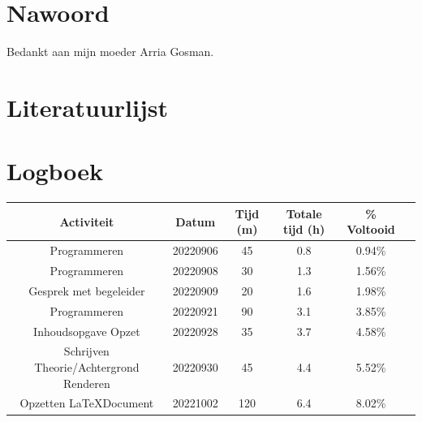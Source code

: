 \documentclass[12pt, a4paper]{article}
\begin{document}
\section{Nawoord}
Bedankt aan mijn moeder Arria Gosman.
\clearpage
\section{Literatuurlijst}


\clearpage
\section{Logboek}
\begin{adjustbox}{angle=270}
\begin{tabular}{ | c | c c c c c | }
\hline
Activiteit & Datum & Tijd (m) & Totale tijd (h) &       \% Voltooid \\
\hline
Programmeren & 20220906 & 45 & 0.8 & 0.94\% \\
Programmeren & 20220908 & 30 & 1.3 & 1.56\% \\
Gesprek met begeleider & 20220909 & 20 & 1.6 & 1.98\% \\
Programmeren & 20220921 & 90 & 3.1 & 3.85\% \\
Inhoudsopgave Opzet & 20220928 & 35 & 3.7 & 4.58\% \\
Schrijven Theorie/Achtergrond Renderen & 20220930 & 45 & 4.4 & 5.52\% \\
Opzetten \LaTeX \space Document & 20221002 & 120 & 6.4 & 8.02\% \\
\hline
\end{tabular}
\end{adjustbox}
\end{document}
